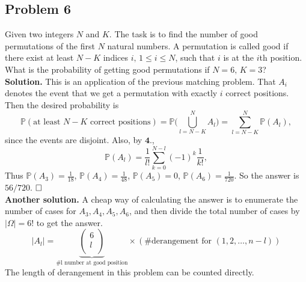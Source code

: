 \documentclass[12pt]{article}
\begin{document}
\subsection*{Problem 6} Given two integers $N$ and $K$. The task is to find the number of good permutations of the first $N$ natural numbers. A permutation is called good if there exist at least $N-K$ indices $i,\,1\leq i\leq N$, such that $i$ is at the $i$th position. What is the probability of getting good permutations if $N= 6,\, K=3$?
\\
\textbf{Solution.} This is an application of the previous matching problem. That $A_i$ denotes the event that we get a permutation with exactly $i$ correct positions. Then the desired probability is
\begin{equation*}
\mathbb{P}(\text{at least $N-K$ correct positions})=\mathbb{P}\Big(\bigcup_{l=N-K}^NA_{l}\Big)=\sum_{l=N-K}^N\mathbb{P}(A_l),
\end{equation*}
since the events are disjoint. Also, by $\textbf{4.}$, 
\begin{equation*}
\mathbb{P}(A_{l})=\frac{1}{l!}\sum_{k=0}^{N-l}(-1)^k\frac{1}{k!},
\end{equation*}
Thus $\mathbb{P}(A_3)=\frac{1}{18}$, $\mathbb{P}(A_4)=\frac{1}{48}$, $\mathbb{P}(A_5)=0$, $\mathbb{P}(A_6)=\frac{1}{720}$. So the answer is $56/720$.
$\hspace{\fill}\square$
\hspace{1 \textwidth}
\\ \textbf{Another solution.} 
A cheap way of calculating the answer is to enumerate the number of cases for $A_3, A_4, A_5, A_6$, and then divide the total number of cases by $|\Omega| = 6! $ to get the answer. 
\[
    |A_l| = \underbrace{\begin{pmatrix}
         6 \\
         l \\
    \end{pmatrix} }_{\# \text{l number at good position} }\times (\# \text{derangement for }  (1,2,\dots, n-l))
\]
The length of derangement in this problem can be counted directly.
\\ \\
\end{document}
